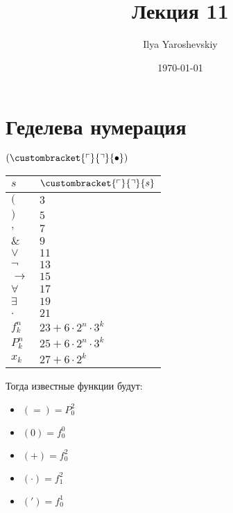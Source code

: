 \documentclass[english]{article}
\author{Ilya Yaroshevskiy}
\date{\today}
\title{Лекция 11}
\newcommand{\gedel}[1]{\custombracket{\ulcorner}{\urcorner}{#1}}
\begin{document}
\maketitle
\tableofcontents



\section{Геделева нумерация}
\label{sec:org09a84c6}
\begin{definition}
	\((\gedel{\bullet})\)
	\begin{center}
		\begin{tabular}{l|l}
			\(s\)       & \(\gedel{s}\)                 \\
			\hline
			\((\)       & \(3\)                         \\
			\hline
			\()\)       & \(5\)                         \\
			\hline
			\(,\)       & \(7\)                         \\
			\hline
			\(\&\)      & \(9\)                         \\
			\hline
			\(\vee\)    & \(11\)                        \\
			\hline
			\(\neg\)    & \(13\)                        \\
			\hline
			\(\to\)     & \(15\)                        \\
			\hline
			\(\forall\) & \(17\)                        \\
			\hline
			\(\exists\) & \(19\)                        \\
			\hline
			\(.\)       & \(21\)                        \\
			\hline
			\(f^n_k\)   & \(23 + 6\cdot 2^n \cdot 3^k\) \\
			\hline
			\(P^n_k\)   & \(25 + 6\cdot 2^n\cdot 3^k\)  \\
			\hline
			\(x_k\)     & \(27 + 6\cdot 2^k\)           \\
		\end{tabular}
	\end{center}
	Тогда известные функции будут:
	\begin{itemize}
		\item \((=) = P^2_0\)
		\item \((0) = f^0_0\)
		\item \((+) = f^2_0\)
		\item \((\cdot) = f^2_1\)
		\item \((') = f^1_0\)
	\end{itemize}
	\label{orge38736f}
\end{definition}
\end{document}
